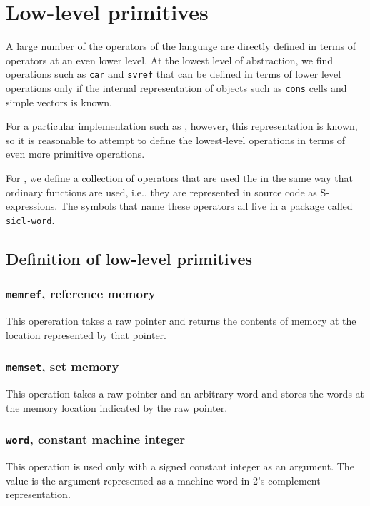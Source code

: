 \chapter{Low-level primitives}

A large number of the operators of the \cl{} language are directly
defined in terms of operators at an even lower level.  At the lowest
level of abstraction, we find operations such as \texttt{car} and
\texttt{svref} that can be defined in terms of lower level operations
only if the internal representation of objects such as \texttt{cons}
cells and simple vectors is known.

For a particular implementation such as \sysname{}, however, this
representation is known, so it is reasonable to attempt to define the
lowest-level \cl{} operations in terms of even more primitive
operations. 

For \sysname{}, we define a collection of operators that are used the
in the same way that ordinary \cl{} functions are used, i.e., they are
represented in source code as S-expressions.  The symbols that name
these operators all live in a package called \texttt{sicl-word}.  

\section{Definition of low-level primitives}

\subsection{\texttt{memref}, reference memory}

This opereration takes a raw pointer and returns the contents of
memory at the location represented by that pointer.

\subsection{\texttt{memset}, set memory}

This operation takes a raw pointer and an arbitrary word and stores
the words at the memory location indicated by the raw pointer.

\subsection{\texttt{word}, constant machine integer}

This operation is used only with a signed constant integer as an
argument.  The value is the argument represented as a machine word in
2's complement representation.

